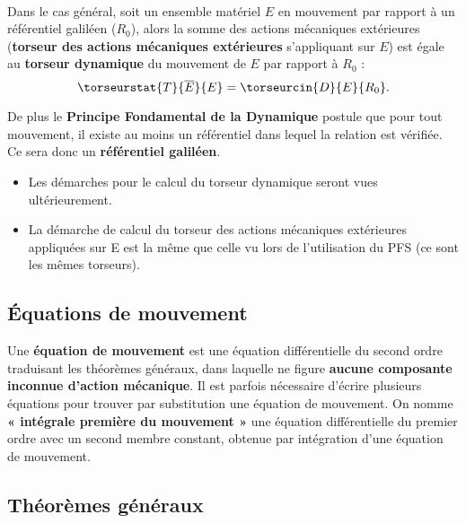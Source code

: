 \begin{definition} ~\\
Dans le cas général, soit un ensemble matériel $E$ en mouvement par rapport à un référentiel galiléen ($R_0$), alors la somme des actions mécaniques extérieures (\textbf{torseur des actions mécaniques extérieures} s'appliquant sur $E$) est égale au \textbf{torseur dynamique} du mouvement de $E$ par rapport à $R_0$ :
$$
\torseurstat{T}{\overline{E}}{E}=\torseurcin{D}{E}{R_0}.
$$

De plus le \textbf{Principe Fondamental de la Dynamique} postule que pour tout mouvement, il existe au moins un référentiel dans lequel la relation est vérifiée. Ce sera donc un \textbf{référentiel galiléen}.

\end{definition}

\begin{rem}
\begin{itemize}
\item Les démarches pour le calcul du torseur dynamique seront vues ultérieurement.
\item La démarche de calcul du torseur des actions mécaniques extérieures appliquées sur E est la  même que celle vu lors de l'utilisation du PFS (ce sont les mêmes torseurs). 
\end{itemize}
\end{rem}

\subsection{Équations de mouvement}

\begin{definition}
Une \textbf{équation de mouvement} est une équation différentielle du second ordre traduisant les théorèmes généraux, dans laquelle ne figure \textbf{aucune composante inconnue d'action mécanique}. Il est parfois nécessaire d'écrire plusieurs équations pour trouver par substitution une équation de mouvement. On nomme \textbf{« intégrale première du mouvement »} une équation différentielle du premier ordre avec un second membre constant, obtenue par  intégration d'une équation de mouvement. 
\end{definition}

\subsection{Théorèmes généraux}

